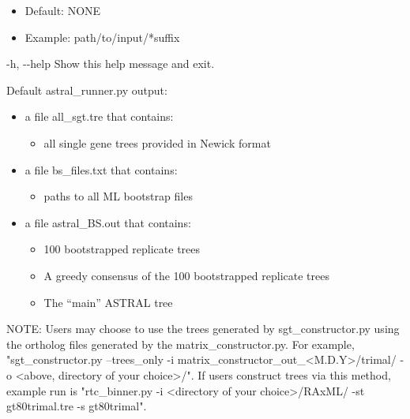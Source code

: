 \documentclass{article}
\begin{document}
\begin{description}
\begin{description}
\begin{description}
                    \begin{itemize}
                        \item Default: NONE
                        \item Example: path/to/input/*suffix
                    \end{itemize}
                    \item -h, -\/-help \hspace{0.2cm} Show this help message and exit.
                \end{description}
            \end{description}
            \vspace{0.2cm}
            \begin{description}
                \item Default astral\_runner.py output:
                \begin{itemize}
                    \item a file all\_sgt.tre that contains:
                    \begin{itemize}
                        \item all single gene trees provided in Newick format
                    \end{itemize}
                    \item a file bs\_files.txt that contains:
                    \begin{itemize}
                        \item paths to all ML bootstrap files
                    \end{itemize}
                    \item a file astral\_BS.out that contains:
                    \begin{itemize}
                        \item 100 bootstrapped replicate trees
                        \item A greedy consensus of the 100 bootstrapped replicate trees
                        \item The “main” ASTRAL tree
                    \end{itemize}
                \end{itemize}
            \end{description}
        \end{description}
        \vspace{0.2cm}
        NOTE: Users may choose to use the trees generated by sgt\_constructor.py using the ortholog files generated by the matrix\_constructor.py. For example, "sgt\_constructor.py --trees\_only -i matrix\_constructor\_out\_<M.D.Y>/trimal/ -o <above, directory of your choice>/". If users construct trees via this method, example run is "rtc\_binner.py -i <directory of your choice>/RAxML/ -st gt80trimal.tre -s gt80trimal".
        
\end{document}
